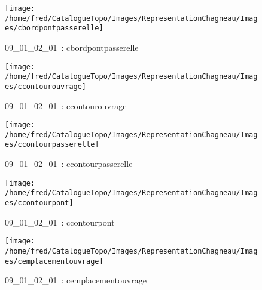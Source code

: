 \documentclass[12pt,titlepage]{book}
\begin{document}
\begin{figure}[h!]
  \hfill         %
  \begin{minipage}[t]{3cm}
    \begin{center}
      \texttt{[image: /home/fred/CatalogueTopo/Images/RepresentationChagneau/Images/cbordpontpasserelle]}
      \caption[~09\_01\_02\_01]{\small{09\_01\_02\_01~:} \tiny{cbordpontpasserelle}}\label{cbordpontpasserelle}
    \end{center}
  \end{minipage}
  \begin{minipage}[t]{3cm}
    \begin{center}
      \texttt{[image: /home/fred/CatalogueTopo/Images/RepresentationChagneau/Images/ccontourouvrage]}
      \caption[~09\_01\_02\_01]{\small{09\_01\_02\_01~:} \tiny{ccontourouvrage}}\label{ccontourouvrage}
    \end{center}
  \end{minipage}
  \begin{minipage}[t]{3cm}
    \begin{center}
      \texttt{[image: /home/fred/CatalogueTopo/Images/RepresentationChagneau/Images/ccontourpasserelle]}
      \caption[~09\_01\_02\_01]{\small{09\_01\_02\_01~:} \tiny{ccontourpasserelle}}\label{ccontourpasserelle}
    \end{center}
  \end{minipage}
  \begin{minipage}[t]{3cm}
    \begin{center}
      \texttt{[image: /home/fred/CatalogueTopo/Images/RepresentationChagneau/Images/ccontourpont]}
      \caption[~09\_01\_02\_01]{\small{09\_01\_02\_01~:} \tiny{ccontourpont}}\label{ccontourpont}
    \end{center}
  \end{minipage}
  \begin{minipage}[t]{3cm}
    \begin{center}
      \texttt{[image: /home/fred/CatalogueTopo/Images/RepresentationChagneau/Images/cemplacementouvrage]}
      \caption[~09\_01\_02\_01]{\small{09\_01\_02\_01~:} \tiny{cemplacementouvrage}}\label{cemplacementouvrage}
    \end{center}
  \end{minipage}
\end{figure}
\end{document}
